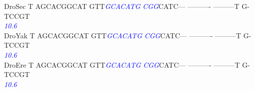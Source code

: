 \documentclass[11pt,twoside,reqno,a4paper]{article}
\begin{document}
{DroSec	T	AGCACGGCAT	GTT\textit{\textcolor{Blue}{G}}\textit{\textcolor{Blue}{C}}\textit{\textcolor{Blue}{A}}\textit{\textcolor{Blue}{C}}\textit{\textcolor{Blue}{A}}\textit{\textcolor{Blue}{T}}\textit{\textcolor{Blue}{G}}	\textit{\textcolor{Blue}{C}}\textit{\textcolor{Blue}{G}}\textit{\textcolor{Blue}{G}}CATC---	----------	---------T	G-TCCGT\\
\hspace*{7\charwidth}\hspace*{1\charwidth}\hspace*{1\charwidth}\hspace*{14\charwidth}\textit{\textcolor{Blue}{10.6}}\hspace*{1\charwidth}\hspace*{1\charwidth}\hspace*{1\charwidth}\hspace*{1\charwidth}\\
DroYak	T	AGCACGGCAT	GTT\textit{\textcolor{Blue}{G}}\textit{\textcolor{Blue}{C}}\textit{\textcolor{Blue}{A}}\textit{\textcolor{Blue}{C}}\textit{\textcolor{Blue}{A}}\textit{\textcolor{Blue}{T}}\textit{\textcolor{Blue}{G}}	\textit{\textcolor{Blue}{C}}\textit{\textcolor{Blue}{G}}\textit{\textcolor{Blue}{G}}CATC---	----------	---------T	G-TCCGT\\
\hspace*{7\charwidth}\hspace*{1\charwidth}\hspace*{1\charwidth}\hspace*{14\charwidth}\textit{\textcolor{Blue}{10.6}}\hspace*{1\charwidth}\hspace*{1\charwidth}\hspace*{1\charwidth}\hspace*{1\charwidth}\\
DroEre	T	AGCACGGCAT	GTT\textit{\textcolor{Blue}{G}}\textit{\textcolor{Blue}{C}}\textit{\textcolor{Blue}{A}}\textit{\textcolor{Blue}{C}}\textit{\textcolor{Blue}{A}}\textit{\textcolor{Blue}{T}}\textit{\textcolor{Blue}{G}}	\textit{\textcolor{Blue}{C}}\textit{\textcolor{Blue}{G}}\textit{\textcolor{Blue}{G}}CATC---	----------	---------T	G-TCCGT\\
\hspace*{7\charwidth}\hspace*{1\charwidth}\hspace*{1\charwidth}\hspace*{14\charwidth}\textit{\textcolor{Blue}{10.6}}\hspace*{1\charwidth}\hspace*{1\charwidth}\hspace*{1\charwidth}\hspace*{1\charwidth}\\
}
\end{document}
